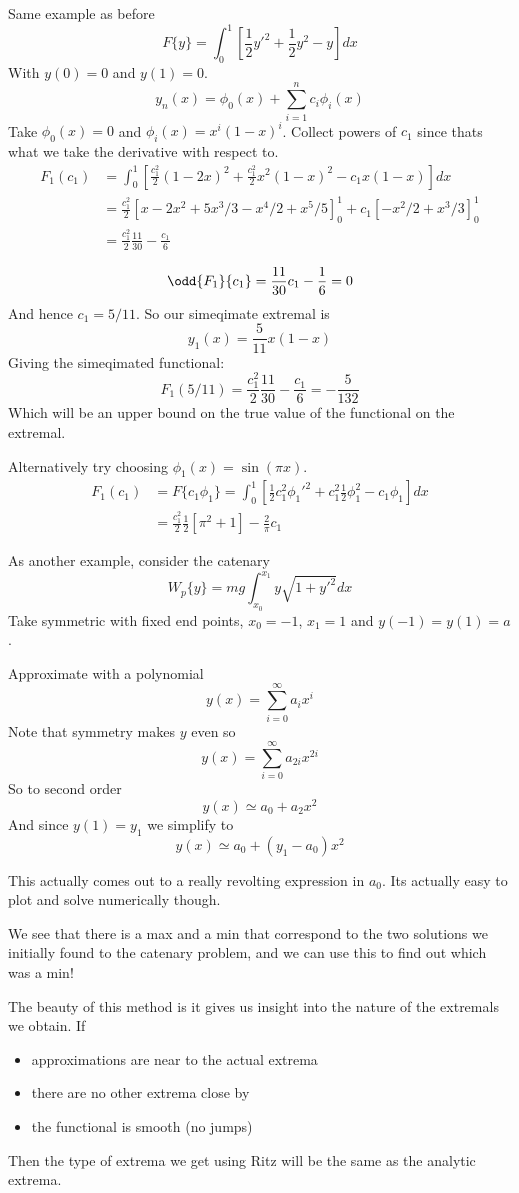 \documentclass{X:/Documents/Coding/Latex/myassignment}
\begin{document}
Same example as before
\[F\{y\} = \int_0^1 \left[\frac12 y'^2 + \frac12 y^2 - y\right] dx\]
With $y(0) = 0$ and $y(1) = 0$.
\[y_n(x) = \phi_0(x) + \sum_{i=1}^n c_i \phi_i (x)\]
Take $\phi_0(x) = 0$ and $\phi_i(x) = x^i (1-x)^i$.
Collect powers of $c_1$ since thats what we take the derivative with respect to.
\begin{align*}
	F_1(c_1) &= \int_0^1 \left[ \frac{c_1^2}{2} \left(1-2x\right)^2 + \frac{c_1^2}{2} x^2(1-x)^2 - c_1 x(1-x)\right] dx\\
	&=\frac{c_1^2}{2} \left[x - 2x^2 + 5x^3/3 - x^4/2 + x^5/5\right]_0^1 + c_1 \left[-x^2/2 + x^3/3\right]_0^1\\
	&= \frac{c_1^2}{2} \frac{11}{30} - \frac{c_1}{6}
\end{align*}

\[\odd{F_1}{c_1} = \frac{11}{30}c_1 - \frac16 = 0\]
And hence $c_1 = 5/11$.
So our simeqimate extremal is
\[y_1(x) = \frac5{11} x(1-x)\]
Giving the simeqimated functional:
\[F_1(5/11) = \frac{c_1^2}{2} \frac{11}{30} - \frac{c_1}{6} = -\frac{5}{132}\]
Which will be an upper bound on the true value of the functional on the extremal.

Alternatively try choosing $\phi_1(x) = \sin(\pi x)$.
\begin{align*}
	F_1(c_1) &= F\{c_1\phi_1\} = \int_0^1 \left[\frac12 c_1^2\phi_1'^2 + c_1^2 \frac12 \phi_1^2 - c_1 \phi_1\right] dx\\
	&= \frac{c_1^2}{2} \frac12 \left[\pi^2 +1\right] - \frac{2}{\pi} c_1
\end{align*}

As another example, consider the catenary 
\[W_p\{y\} = mg \int_{x_0}^{x_1} y\sqrt{1+y'^2}dx\]
Take symmetric with fixed end points, $x_0 = -1$, $x_1 = 1$ and $y(-1) = y(1) = a$.

Approximate with a polynomial
\[y(x) = \sum_{i=0}^\infty a_i x^i\]
Note that symmetry makes $y$ even so
\[y(x) = \sum_{i=0}^\infty a_{2i} x^{2i}\]
So to second order
\[y(x) \simeq a_0 + a_2 x^2\]
And since $y(1) = y_1$ we simplify to 
\[y(x) \simeq a_0 + (y_1-a_0)x^2\]

This actually comes out to a really revolting expression in $a_0$. Its actually easy to plot and solve numerically though.

We see that there is a max and a min that correspond to the two solutions we initially found to the catenary problem, and we can use this to find out which was a min!

The beauty of this method is it gives us insight into the nature of the extremals we obtain. If 
\begin{itemize}
	\item approximations are near to the actual extrema
	\item there are no other extrema close by
	\item the functional is smooth (no jumps)
\end{itemize}
Then the type of extrema we get using Ritz will be the same as the analytic extrema.
\end{document}
